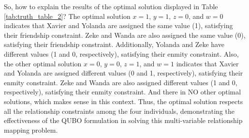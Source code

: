 So, how to explain the results of the optimal solution displayed in Table \ref{tab:truth_table_2}? The optimal solution $x=1$, $y=1$, $z=0$, and $w=0$ indicates that Xavier and Yolanda are assigned the same value (1), satisfying their friendship constraint. Zeke and Wanda are also assigned the same value (0), satisfying their friendship constraint. Additionally, Yolanda and Zeke have different values (1 and 0, respectively), satisfying their enmity constraint. Also, the other optimal solution $x=0$, $y=0$, $z=1$, and $w=1$ indicates that Xavier and Yolanda are assigned different values (0 and 1, respectively), satisfying their enmity constraint. Zeke and Wanda are also assigned different values (1 and 0, respectively), satisfying their enmity constraint. And there in NO other optimal solutions, which makes sense in this context.
Thus, the optimal solution respects all the relationship constraints among the four individuals, demonstrating the effectiveness of the QUBO formulation in solving this multi-variable relationship mapping problem.